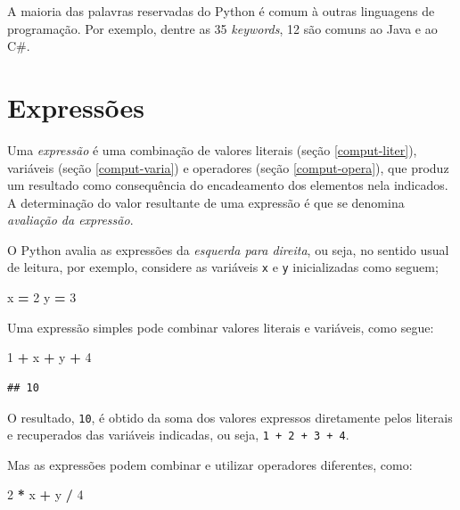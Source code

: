 \documentclass[
]{book}
\newenvironment{Shaded}{\begin{snugshade}}{\end{snugshade}}
\newcommand{\DecValTok}[1]{\textcolor[rgb]{0.00,0.00,0.81}{#1}}
\newcommand{\NormalTok}[1]{#1}
\newcommand{\OperatorTok}[1]{\textcolor[rgb]{0.81,0.36,0.00}{\textbf{#1}}}
\begin{document}
A maioria das palavras reservadas do Python é comum à outras linguagens de programação. Por exemplo, dentre as 35 \emph{keywords}, 12 são comuns ao Java e ao C\#.

\hypertarget{comput-expre}{%
\section{Expressões}\label{comput-expre}}

Uma \emph{expressão} é uma combinação de valores literais (seção \ref{comput-liter}), variáveis (seção \ref{comput-varia}) e operadores (seção \ref{comput-opera}), que produz um resultado como consequência do encadeamento dos elementos nela indicados. A determinação do valor resultante de uma expressão é que se denomina \emph{avaliação da expressão}.

O Python avalia as expressões da \emph{esquerda para direita}, ou seja, no sentido usual de leitura, por exemplo, considere as variáveis \texttt{x} e \texttt{y} inicializadas como seguem;

\begin{Shaded}
\begin{Highlighting}[]
\NormalTok{x }\OperatorTok{=} \DecValTok{2}
\NormalTok{y }\OperatorTok{=} \DecValTok{3}
\end{Highlighting}
\end{Shaded}

Uma expressão simples pode combinar valores literais e variáveis, como segue:

\begin{Shaded}
\begin{Highlighting}[]
\DecValTok{1} \OperatorTok{+}\NormalTok{ x }\OperatorTok{+}\NormalTok{ y }\OperatorTok{+} \DecValTok{4}
\end{Highlighting}
\end{Shaded}

\begin{verbatim}
## 10
\end{verbatim}

O resultado, \texttt{10}, é obtido da soma dos valores expressos diretamente pelos literais e recuperados das variáveis indicadas, ou seja, \texttt{1\ +\ 2\ +\ 3\ +\ 4}.

Mas as expressões podem combinar e utilizar operadores diferentes, como:

\begin{Shaded}
\begin{Highlighting}[]
\DecValTok{2} \OperatorTok{*}\NormalTok{ x }\OperatorTok{+}\NormalTok{ y }\OperatorTok{/} \DecValTok{4}
\end{Highlighting}
\end{Shaded}
\end{document}
